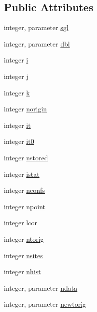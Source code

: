 \subsection*{Public Attributes}
\begin{DoxyCompactItemize}
\item 
integer, parameter \hyperlink{classcorr__pdf__av__en_a5ec9ccef939e9ee720d5f36f9c6da620}{sgl}
\item 
integer, parameter \hyperlink{classcorr__pdf__av__en_a411e74f2fd514aedb12054b21e1d7c58}{dbl}
\item 
integer \hyperlink{classcorr__pdf__av__en_a6becc690d925f29e3c0cadb6ec351d46}{i}
\item 
integer \hyperlink{classcorr__pdf__av__en_a005d609e5703c09a8cf674cc770f729c}{j}
\item 
integer \hyperlink{classcorr__pdf__av__en_ae30ef2e38f96217cc2423e3f66c7dbeb}{k}
\item 
integer \hyperlink{classcorr__pdf__av__en_a68995e0fe94c4ff613dd3d6c7f380896}{norigin}
\item 
integer \hyperlink{classcorr__pdf__av__en_ad262d96329c39ad79417bef176593697}{it}
\item 
integer \hyperlink{classcorr__pdf__av__en_a771bb95a6cf163c8cb1b84da5656f9d9}{it0}
\item 
integer \hyperlink{classcorr__pdf__av__en_acf731df4af6c01560652a65159e0f7f7}{nstored}
\item 
integer \hyperlink{classcorr__pdf__av__en_af28ea8fd0108e9b3676437ca596761f3}{istat}
\item 
integer \hyperlink{classcorr__pdf__av__en_a9c24f80f50e32ff3685d3afa3e42685d}{nconfs}
\item 
integer \hyperlink{classcorr__pdf__av__en_a5ff4624931de7b618bacc90944908133}{npoint}
\item 
integer \hyperlink{classcorr__pdf__av__en_aa6754e8e9bfdd9a2cbc03364843ce557}{lcor}
\item 
integer \hyperlink{classcorr__pdf__av__en_ae8807b4964dcdef98e16911d1d3a2ca0}{ntorig}
\item 
integer \hyperlink{classcorr__pdf__av__en_a7f5343d880e5cc9e13e270c324fb139e}{nsites}
\item 
integer \hyperlink{classcorr__pdf__av__en_acd2cbcc639b184a368f0bcaa537f8c8c}{nhist}
\item 
integer, parameter \hyperlink{classcorr__pdf__av__en_abcec8d4e060ae85240b86b572037a0cd}{ndata}
\item 
integer, parameter \hyperlink{classcorr__pdf__av__en_a74c790891424d457e8fe3a6274dbe1a6}{newtorig}

\end{DoxyCompactItemize}
